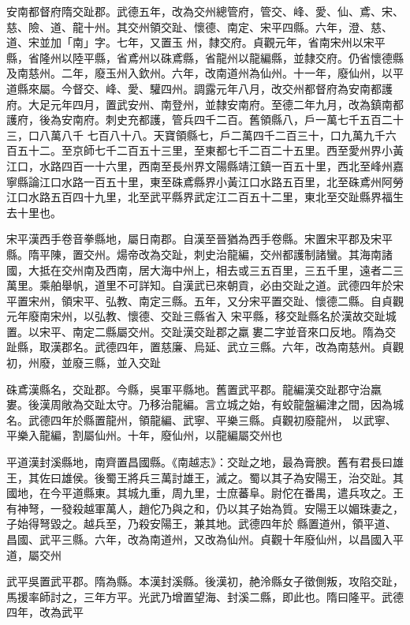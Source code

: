 \begin{pinyinscope}
 安南都督府隋交趾郡。武德五年，改為交州總管府，管交、峰、愛、仙、鳶、宋、慈、險、道、龍十州。其交州領交趾、懷德、南定、宋平四縣。六年，澄、慈、道、宋並加「南」字。七年，又置玉
 州，隸交府。貞觀元年，省南宋州以宋平縣，省隆州以陸平縣，省鳶州以硃鳶縣，省龍州以龍編縣，並隸交府。仍省懷德縣及南慈州。二年，廢玉州入欽州。六年，改南道州為仙州。十一年，廢仙州，以平道縣來屬。今督交、峰、愛、驩四州。調露元年八月，改交州都督府為安南都護府。大足元年四月，置武安州、南登州，並隸安南府。至德二年九月，改為鎮南都護府，後為安南府。刺史充都護，管兵四千二百。舊領縣八，戶一萬七千五百二十三，口八萬八千
 七百八十八。天寶領縣七，戶二萬四千二百三十，口九萬九千六百五十二。至京師七千二百五十三里，至東都七千二百二十五里。西至愛州界小黃江口，水路四百一十六里，西南至長州界文陽縣靖江鎮一百五十里，西北至峰州嘉寧縣論江口水路一百五十里，東至硃鳶縣界小黃江口水路五百里，北至硃鳶州阿勞江口水路五百四十九里，北至武平縣界武定江二百五十二里，東北至交趾縣界福生去十里也。



 宋平漢西手卷音拳縣地，屬日南郡。自漢至晉猶為西手卷縣。宋置宋平郡及宋平縣。隋平陳，置交州。煬帝改為交趾，刺史治龍編，交州都護制諸蠻。其海南諸國，大抵在交州南及西南，居大海中州上，相去或三五百里，三五千里，遠者二三萬里。乘舶舉帆，道里不可詳知。自漢武已來朝貢，必由交趾之道。武德四年於宋平置宋州，領宋平、弘教、南定三縣。五年，又分宋平置交趾、懷德二縣。自貞觀元年廢南宋州，以弘教、懷德、交趾三縣省入
 宋平縣，移交趾縣名於漢故交趾城置。以宋平、南定二縣屬交州。交趾漢交趾郡之羸婁二字並音來口反地。隋為交趾縣，取漢郡名。武德四年，置慈廉、烏延、武立三縣。六年，改為南慈州。貞觀初，州廢，並廢三縣，並入交趾



 硃鳶漢縣名，交趾郡。今縣，吳軍平縣地。舊置武平郡。龍編漢交趾郡守治羸婁。後漢周敞為交趾太守。乃移治龍編。言立城之始，有蛟龍盤編津之間，因為城名。武德四年於縣置龍州，領龍編、武寧、平樂三縣。貞觀初廢龍州，
 以武寧、平樂入龍編，割屬仙州。十年，廢仙州，以龍編屬交州也



 平道漢封溪縣地，南齊置昌國縣。《南越志》：交趾之地，最為膏腴。舊有君長曰雄王，其佐曰雄侯。後蜀王將兵三萬討雄王，滅之。蜀以其子為安陽王，治交趾。其國地，在今平道縣東。其城九重，周九里，士庶蕃阜。尉佗在番禺，遣兵攻之。王有神弩，一發殺越軍萬人，趙佗乃與之和，仍以其子始為質。安陽王以媚珠妻之，子始得弩毀之。越兵至，乃殺安陽王，兼其地。武德四年於
 縣置道州，領平道、昌國、武平三縣。六年，改為南道州，又改為仙州。貞觀十年廢仙州，以昌國入平道，屬交州



 武平吳置武平郡。隋為縣。本漢封溪縣。後漢初，赩泠縣女子徵側叛，攻陷交趾，馬援率師討之，三年方平。光武乃增置望海、封溪二縣，即此也。隋曰隆平。武德四年，改為武平




\end{pinyinscope}
